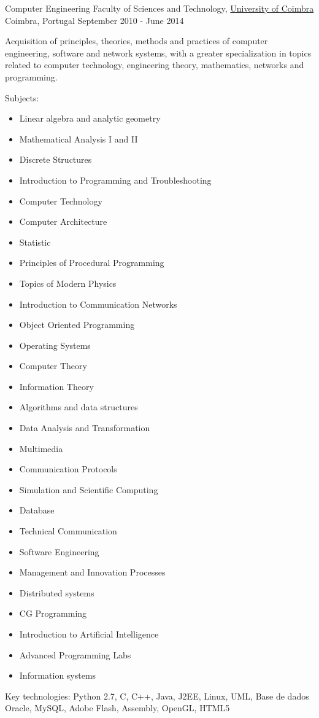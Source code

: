 \begin{cventries}
\cventry
{Computer Engineering} %
{Faculty of Sciences and Technology, \href{https://www.uc.pt/}{University of Coimbra}} %
{Coimbra, Portugal} %
{September 2010 - June 2014} %
{  %
\begin{cvitems}
\item {Acquisition of principles, theories, methods and practices of computer engineering, software and network systems, with a greater specialization in topics related to computer technology, engineering theory, mathematics, networks and programming.}
\item{Subjects:}
\begin{itemize}
\item Linear algebra and analytic geometry
\item Mathematical Analysis I and II
\item Discrete Structures
\item Introduction to Programming and Troubleshooting
\item Computer Technology
\item Computer Architecture
\item Statistic
\item Principles of Procedural Programming
\item Topics of Modern Physics
\item Introduction to Communication Networks
\item Object Oriented Programming
\item Operating Systems
\item Computer Theory
\item Information Theory
\item Algorithms and data structures
\item Data Analysis and Transformation
\item Multimedia
\item Communication Protocols
\item Simulation and Scientific Computing
\item Database
\item Technical Communication
\item Software Engineering
\item Management and Innovation Processes
\item Distributed systems
\item CG Programming
\item Introduction to Artificial Intelligence
\item Advanced Programming Labs
\item Information systems
\end{itemize}
\item{Key technologies: Python 2.7, C, C++, Java, J2EE, Linux, UML, Base de dados Oracle, MySQL, Adobe Flash, Assembly, OpenGL, HTML5 }
\end{cvitems}
}



\end{cventries}
